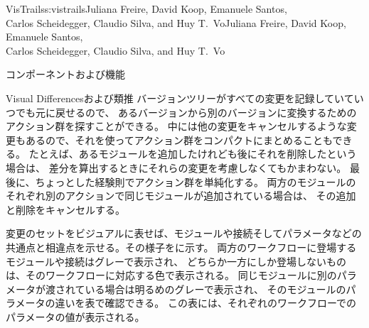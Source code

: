 \begin{aosachaptertoc}{VisTrails}{s:vistrails}{Juliana Freire, David Koop, Emanuele Santos, \\ Carlos Scheidegger, Claudio Silva, and Huy T.\ Vo}{Juliana Freire, David Koop, Emanuele Santos, \\ \hspace*{0.9cm} Carlos Scheidegger, Claudio Silva, and Huy T.\ Vo}
\begin{aosasect1}{コンポーネントおよび機能}
\begin{aosasect2}{Visual Differencesおよび類推}
バージョンツリーがすべての変更を記録していていつでも元に戻せるので、
あるバージョンから別のバージョンに変換するためのアクション群を探すことができる。
中には他の変更をキャンセルするような変更もあるので、それを使ってアクション群をコンパクトにまとめることもできる。
たとえば、あるモジュールを追加したけれども後にそれを削除したという場合は、
差分を算出するときにそれらの変更を考慮しなくてもかまわない。
最後に、ちょっとした経験則でアクション群を単純化する。
両方のモジュールのそれぞれ別のアクションで同じモジュールが追加されている場合は、
その追加と削除をキャンセルする。

変更のセットをビジュアルに表せば、モジュールや接続そしてパラメータなどの
共通点と相違点を示せる。その様子をに示す。
両方のワークフローに登場するモジュールや接続はグレーで表示され、
どちらか一方にしか登場しないものは、そのワークフローに対応する色で表示される。
同じモジュールに別のパラメータが渡されている場合は明るめのグレーで表示され、
そのモジュールのパラメータの違いを表で確認できる。
この表には、それぞれのワークフローでのパラメータの値が表示される。


\end{aosasect2}
\end{aosasect1}
\end{aosachaptertoc}
